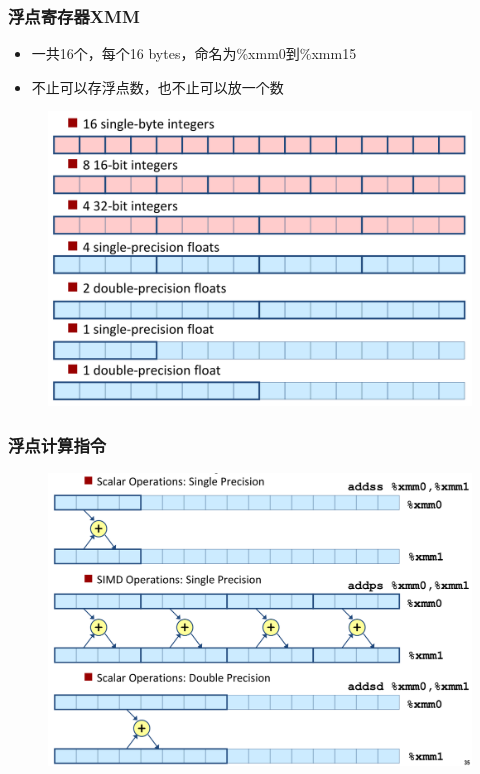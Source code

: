 \documentclass[12pt,AutoFakeBold,aspectratio=169,mathserif]{beamer}
\begin{document}
    \begin{frame}
        \frametitle{浮点寄存器XMM}
    
        \begin{itemize}
            \item 一共16个，每个16 bytes，命名为\%xmm0到\%xmm15
            \item 不止可以存浮点数，也不止可以放一个数
        \end{itemize}

        \begin{figure}
            \includegraphics[height=.6\paperheight]{figures/xmm.png}
        \end{figure}
    
    \end{frame}

    \begin{frame}
        \frametitle{浮点计算指令}
    
        \begin{figure}
            \includegraphics[width=.7\textwidth]{figures/fpu.png}
        \end{figure}
    
    \end{frame}
\end{document}
